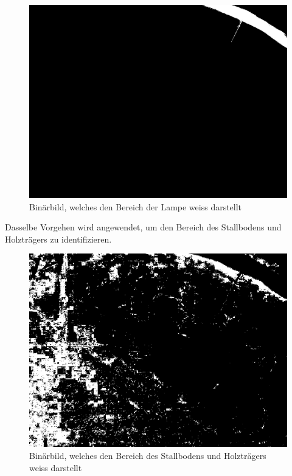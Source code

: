 \begin{figure}[H]
	\center
	\includegraphics[scale=0.43]{Grafiken/entwicklung/3binBildLampe.jpg}
	\caption{Binärbild, welches den Bereich der Lampe weiss darstellt} 
	\label{fig: Binärbild, welches den Bereich der Lampe weiss darstellt}
\end{figure}

Dasselbe Vorgehen wird angewendet, um den Bereich des Stallbodens und Holzträgers zu identifizieren.

\begin{figure}[H]
	\center
	\includegraphics[scale=0.43]{Grafiken/entwicklung/4binBildHolz.jpg}
	\caption{Binärbild, welches den Bereich des Stallbodens und Holzträgers weiss darstellt} 
	\label{fig: Binärbild, welches den Bereich des Stallbodens und Holzträgers weiss darstellt}
\end{figure}

